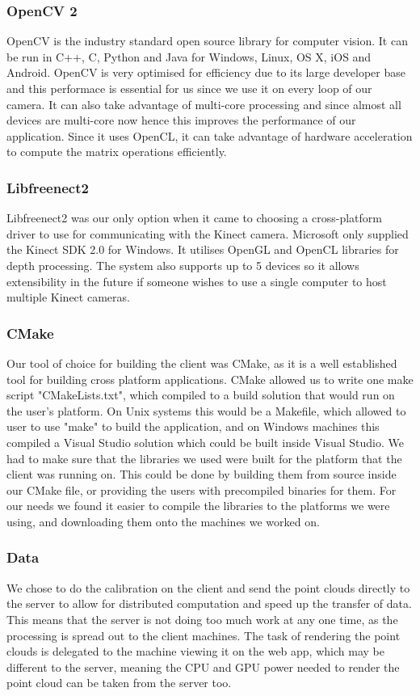 \documentclass{article}
\begin{document}
\subsubsection{OpenCV 2}
OpenCV is the industry standard open source library for computer vision. It can be run in C++, C, Python and Java for Windows, Linux, OS X, iOS and Android. OpenCV is very optimised for efficiency due to its large developer base and this performace is essential for us since we use it on every loop of our camera. It can also take advantage of multi-core processing and since almost all devices are multi-core now hence this improves the performance of our application. Since it uses OpenCL, it can take advantage of hardware acceleration to compute the matrix operations efficiently.
\subsubsection{Libfreenect2}
Libfreenect2 was our only option when it came to choosing a cross-platform driver to use for communicating with the Kinect camera. Microsoft only supplied the Kinect SDK 2.0 for Windows. It utilises OpenGL and OpenCL libraries for depth processing. The system also supports up to 5 devices so it allows extensibility in the future if someone wishes to use a single computer to host multiple Kinect cameras.
\subsubsection{CMake}
Our tool of choice for building the client was CMake, as it is a well established tool for building cross platform applications. CMake allowed us to write one make script "CMakeLists.txt", which compiled to a build solution that would run on the user's platform. On Unix systems this would be a Makefile, which allowed to user to use "make" to build the application, and on Windows machines this compiled a Visual Studio solution which could be built inside Visual Studio. We had to make sure that the libraries we used were built for the platform that the client was running on. This could be done by building them from source inside our CMake file, or providing the users with precompiled binaries for them. For our needs we found it easier to compile the libraries to the platforms we were using, and downloading them onto the machines we worked on. 
\subsubsection{Data}
We chose to do the calibration on the client and send the point clouds directly to the server to allow for distributed computation and speed up the transfer of data. This means that the server is not doing too much work at any one time, as the processing is spread out to the client machines. The task of rendering the point clouds is delegated to the machine viewing it on the web app, which may be different to the server, meaning the CPU and GPU power needed to render the point cloud can be taken from the server too.
\end{document}
